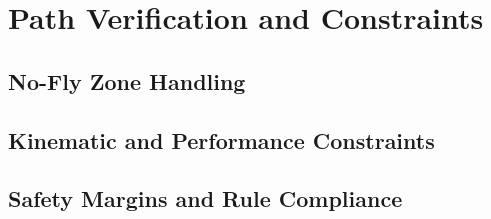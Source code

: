 \chapter{Path Verification and Constraints}%
\label{s_verification}

\section{No-Fly Zone Handling}%
\label{s_motivation}

\section{Kinematic and Performance Constraints}%
\label{s_contribution}

\section{Safety Margins and Rule Compliance}%
\label{s_structure}
